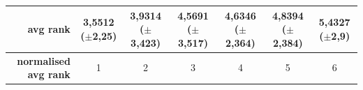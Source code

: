 \documentclass[preprint,review,12pt]{elsarticle}
\begin{document}
\begin{table}[!tb]
{\begin{tabular}{r|ccc|c|c|c|}
			\midrule
			\textbf{avg rank}             & \cellcolor[rgb]{ .388,  .745,  .482}3,5512 ($\pm$2,25)                             & \cellcolor[rgb]{ .471,  .769,  .486}3,9314 ($\pm$3,423) & \cellcolor[rgb]{ .616,  .808,  .494}4,5691 ($\pm$3,517) & \cellcolor[rgb]{ .631,  .812,  .494}4,6346 ($\pm$2,364) & \cellcolor[rgb]{ .675,  .827,  .498}4,8394 ($\pm$2,384) & \cellcolor[rgb]{ .808,  .867,  .506}5,4327 ($\pm$2,9)   \\
			\midrule
			\textbf{normalised avg rank}  & \cellcolor[rgb]{ .388,  .745,  .482}1                                              & \cellcolor[rgb]{ .49,  .773,  .486}2                    & \cellcolor[rgb]{ .592,  .804,  .494}3                   & \cellcolor[rgb]{ .694,  .831,  .498}4                   & \cellcolor[rgb]{ .796,  .863,  .506}5                   & \cellcolor[rgb]{ .898,  .89,  .51}6                     \\
			\cmidrule{5-5}\cmidrule{7-7}\end{tabular}%
	}
\end{table}%
\end{document}
